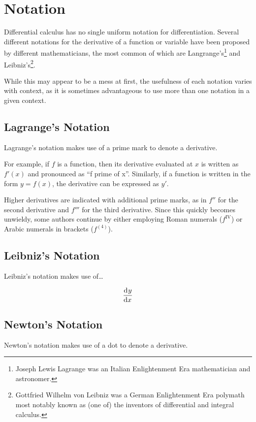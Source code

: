 \documentclass[headings=standardclasses]{scrreprt}
\begin{document}
\section{Notation}

Differential calculus has no single uniform notation for differentiation.
Several different notations for the derivative of a function or variable have
been proposed by different mathematicians, the most common of which are
Langrange's\footnote{Joseph Lewis Lagrange was an Italian Enlightenment Era
  mathematician and astronomer.} and Leibniz's\footnote{Gottfried Wilhelm von
  Leibniz was a German Enlightenment Era polymath most notably known as (one of)
  the inventors of differential and integral calculus.}.

While this may appear to be a mess at first, the usefulness of each notation
varies with context, as it is sometimes advantageous to use more than one
notation in a given context.

\subsection{Lagrange's Notation}

Lagrange's notation makes use of a prime mark to denote a derivative.

For example, if \(f\) is a function, then its derivative evaluated at \(x\) is
written as \(f'(x)\) and pronounced as \enquote{f prime of x}. Similarly, if a
function is written in the form \(y = f(x)\), the derivative can be expressed as
\(y'\).

Higher derivatives are indicated with additional prime marks, as in \(f''\) for
the second derivative and \(f'''\) for the third derivative. Since this quickly
becomes unwieldy, some authors continue by either employing Roman numerals
(\(f^{\mathrm{IV}}\)) or Arabic numerals in brackets (\(f^{(4)}\)).

\subsection{Leibniz's Notation}

Leibniz's notation makes use of\ldots

\[ \frac{\operatorname{d\!}{^{}}y}{\operatorname{d\!}{x^{}}} \]

\subsection{Newton's Notation}

Newton's notation makes use of a dot to denote a derivative.
\end{document}
